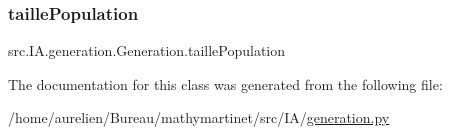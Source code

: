 \subsubsection{\texorpdfstring{taille\+Population}{taillePopulation}}
{\footnotesize\ttfamily src.\+I\+A.\+generation.\+Generation.\+taille\+Population}



The documentation for this class was generated from the following file\+:\begin{DoxyCompactItemize}
\item 
/home/aurelien/\+Bureau/mathymartinet/src/\+I\+A/\hyperlink{generation_8py}{generation.\+py}\end{DoxyCompactItemize}
